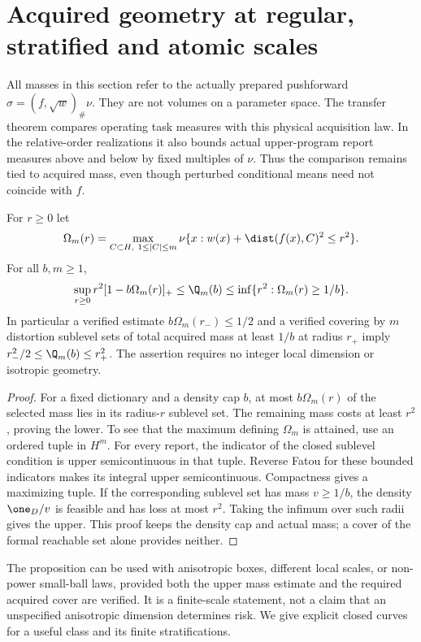 \section{Acquired geometry at regular, stratified and atomic scales}\label{sec:geometry}
All masses in this section refer to the actually prepared pushforward
$\sigma=(f,\sqrt w)_\#\nu$. They are not volumes on a parameter space. The transfer theorem compares operating task measures with this physical acquisition law. In the relative-order realizations it also bounds actual upper-program report measures above and below by fixed multiples of $\nu$. Thus the comparison remains tied to acquired mass, even though perturbed conditional means need not coincide with $f$.

\begin{proposition}\label{prop:sublevel}
For $r\ge0$ let
\[
 \Omega_m(r)=\max_{C\subset H,\ 1\le|C|\le m}
       \nu\{x:w(x)+\dist(f(x),C)^2\le r^2\}.
\]
For all $b,m\ge1$,
\begin{equation}\label{eq:sublevel-bounds}
 \sup_{r\ge0}r^2[1-b\Omega_m(r)]_+
 \le\Q_m(b)
 \le\inf\{r^2:\Omega_m(r)\ge1/b\}.
\end{equation}
In particular a verified estimate $b\Omega_m(r_-)\le1/2$ and a verified covering by $m$ distortion sublevel sets of total acquired mass at least $1/b$ at radius $r_+$ imply $r_-^2/2\le\Q_m(b)\le r_+^2$. The assertion requires no integer local dimension or isotropic geometry.
\end{proposition}
\begin{proof}
For a fixed dictionary and a density cap $b$, at most $b\Omega_m(r)$ of the selected mass lies in its radius-$r$ sublevel set. The remaining mass costs at least $r^2$, proving the lower. To see that the maximum defining $\Omega_m$ is attained, use an ordered tuple in $H^m$. For every report, the indicator of the closed sublevel condition is upper semicontinuous in that tuple. Reverse Fatou for these bounded indicators makes its integral upper semicontinuous. Compactness gives a maximizing tuple. If the corresponding sublevel set has mass $v\ge1/b$, the density $\one_D/v$ is feasible and has loss at most $r^2$. Taking the infimum over such radii gives the upper. This proof keeps the density cap and actual mass; a cover of the formal reachable set alone provides neither.
\end{proof}

The proposition can be used with anisotropic boxes, different local scales, or non-power small-ball laws, provided both the upper mass estimate and the required acquired cover are verified. It is a finite-scale statement, not a claim that an unspecified anisotropic dimension determines risk. We give explicit closed curves for a useful class and its finite stratifications.

